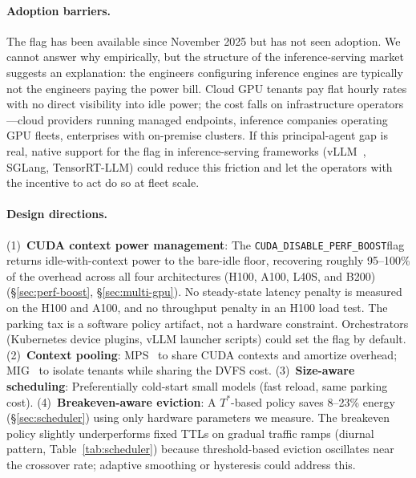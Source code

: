 \documentclass[sigconf,nonacm]{acmart}
\newcommand{\perfboost}{\texttt{CUDA\_\hspace{0pt}DISABLE\_\hspace{0pt}PERF\_\hspace{0pt}BOOST}}
\begin{document}
\paragraph{Adoption barriers.}
The flag has been available since November 2025 but has not seen adoption. We cannot answer why empirically, but the structure of the inference-serving market suggests an explanation: the engineers configuring inference engines are typically not the engineers paying the power bill. Cloud GPU tenants pay flat hourly rates with no direct visibility into idle power; the cost falls on infrastructure operators---cloud providers running managed endpoints, inference companies operating GPU fleets, enterprises with on-premise clusters. If this principal-agent gap is real, native support for the flag in inference-serving frameworks (vLLM~\cite{vllm}, SGLang, TensorRT-LLM) could reduce this friction and let the operators with the incentive to act do so at fleet scale.

\paragraph{Design directions.} (1)~\textbf{CUDA context power management}: The \perfboost flag returns idle-with-context power to the bare-idle floor, recovering roughly 95--100\% of the overhead across all four architectures (H100, A100, L40S, and B200) (\S\ref{sec:perf-boost}, \S\ref{sec:multi-gpu}). No steady-state latency penalty is measured on the H100 and A100, and no throughput penalty in an H100 load test. The parking tax is a software policy artifact, not a hardware constraint. Orchestrators (Kubernetes device plugins, vLLM launcher scripts) could set the flag by default. (2)~\textbf{Context pooling}: MPS~\cite{nvidia-mps} to share CUDA contexts and amortize overhead; MIG~\cite{nvidia-mig} to isolate tenants while sharing the DVFS cost. (3)~\textbf{Size-aware scheduling}: Preferentially cold-start small models (fast reload, same parking cost). (4)~\textbf{Breakeven-aware eviction}: A $T^*$-based policy saves 8--23\% energy (\S\ref{sec:scheduler}) using only hardware parameters we measure. The breakeven policy slightly underperforms fixed TTLs on gradual traffic ramps (diurnal pattern, Table~\ref{tab:scheduler}) because threshold-based eviction oscillates near the crossover rate; adaptive smoothing or hysteresis could address this.
\end{document}
